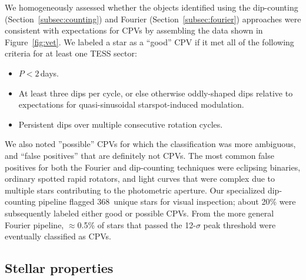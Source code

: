 \documentclass[11pt,twocolumn,tighten]{aastex63}
\newcommand{\nuniqdipflagged}{{368}} %
\begin{document}
We homogeneously assessed whether the objects identified using the
dip-counting (Section~\ref{subsec:counting}) and Fourier
(Section~\ref{subsec:fourier}) approaches were consistent with
expectations for CPVs by assembling the data shown in
Figure~\ref{fig:vet}.  We labeled a star as a ``good'' CPV if it met
all of the following criteria for at least one TESS sector:
\vspace{-2pt}
\begin{itemize}[leftmargin=*]
  \setlength\itemsep{-2pt}
  \item $P<2$\,days.
  \item At least three dips per cycle, or else otherwise oddly-shaped
    dips relative to expectations for quasi-sinusoidal
    starspot-induced modulation.
  \item Persistent dips over multiple consecutive rotation cycles.
\end{itemize}
\vspace{-2pt}
We also noted ''possible'' CPVs for which the classification was more
ambiguous, and ``false positives'' that are definitely not CPVs.  The
most common false positives for both the Fourier and dip-counting
techniques were eclipsing binaries, ordinary spotted rapid rotators,
and light curves that were complex due to multiple stars contributing
to the photometric aperture.  Our specialized dip-counting pipeline
flagged \nuniqdipflagged\ unique stars for visual inspection; about
20\% were subsequently labeled either good or possible CPVs.  From the
more general Fourier pipeline, $\approx$0.5\% of stars that passed the
12-$\sigma$ peak threshold were eventually classified as CPVs.



\subsection{Stellar properties}
\label{subsec:starprops}
\end{document}
